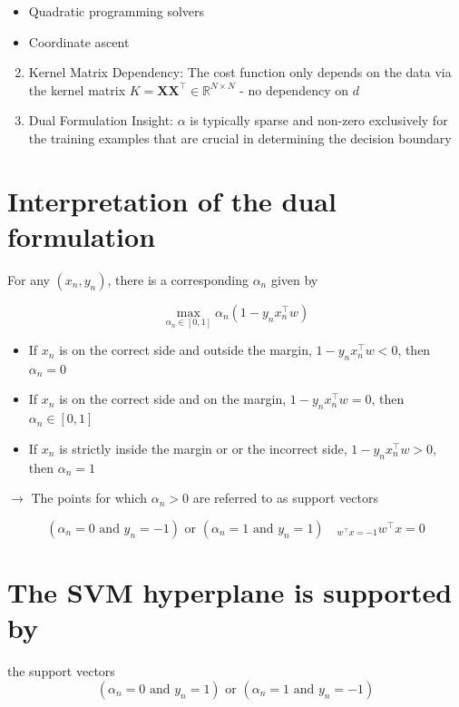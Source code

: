 \documentclass[10pt]{article}
\begin{document}
\begin{itemize}
  \item Quadratic programming solvers
  \item Coordinate ascent
\end{itemize}

\begin{enumerate}
  \setcounter{enumi}{1}
  \item Kernel Matrix Dependency: The cost function only depends on the data via the kernel matrix $K=\mathbf{X} \mathbf{X}^{\top} \in \mathbb{R}^{N \times N}$ - no dependency on $d$

  \item Dual Formulation Insight: $\alpha$ is typically sparse and non-zero exclusively for the training examples that are crucial in determining the decision boundary

\end{enumerate}

\section*{Interpretation of the dual formulation}
For any $\left(x_{n}, y_{n}\right)$, there is a corresponding $\alpha_{n}$ given by

$$
\max _{\alpha_{n} \in[0,1]} \alpha_{n}\left(1-y_{n} x_{n}^{\top} w\right)
$$

\begin{itemize}
  \item If $x_{n}$ is on the correct side and outside the margin, $1-y_{n} x_{n}^{\top} w<0$, then $\alpha_{n}=0$
  \item If $x_{n}$ is on the correct side and on the margin, $1-y_{n} x_{n}^{\top} w=0$, then $\alpha_{n} \in[0,1]$
  \item If $x_{n}$ is strictly inside the margin or or the incorrect side, $1-y_{n} x_{n}^{\top} w>0$, then $\alpha_{n}=1$
\end{itemize}

$\rightarrow$ The points for which $\alpha_{n}>0$ are referred to as support vectors

$$
\left(\alpha_{n}=0 \text { and } y_{n}=-1\right) \text { or }\left(\alpha_{n}=1 \text { and } y_{n}=1\right) \quad{ }_{w^{\top} x=-1} w^{\top} x=0
$$

\section*{The SVM hyperplane is supported by}
 the support vectors$$
\left(\alpha_{n}=0 \text { and } y_{n}=1\right) \text { or }\left(\alpha_{n}=1 \text { and } y_{n}=-1\right)
$$
\end{document}
